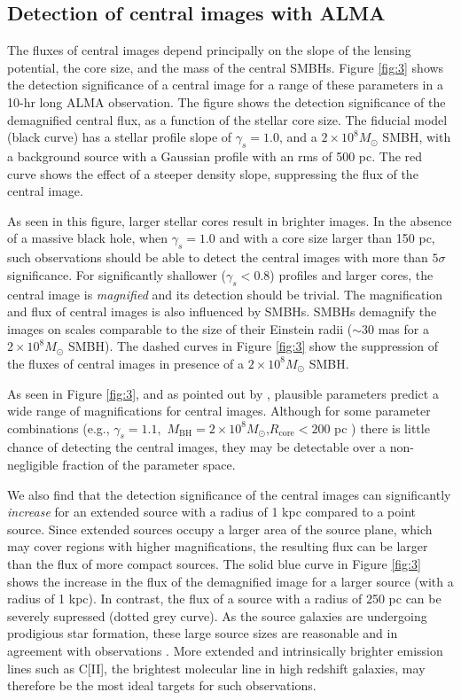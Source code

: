 \documentclass[chicago]{emulateapj}
\begin{document}
\subsection{Detection of central images with ALMA}
The fluxes of central images depend principally on the slope of the lensing potential, the core size, and the mass of the central SMBHs.  Figure \ref{fig:3} shows the detection significance of a central image for a range of these parameters in a 10-hr long ALMA observation. 
The figure shows the detection significance of the demagnified central flux, as a function of the stellar core size.
The fiducial model (black curve) has a stellar profile slope of $\gamma_s=1.0$, and a $2\times10^8M_{\odot}$ SMBH, with a background source 
with a Gaussian profile with an rms of 500 pc.  The red curve shows the effect of a steeper density slope, suppressing the flux of the central image. 




As seen in this figure, larger stellar cores result in brighter images. 
In the absence of a massive black hole, when $\gamma_s=1.0$ and with a core size larger than 150 pc, such observations should be able to detect the central images with more than $5\sigma$ significance. For significantly shallower ($\gamma_s<0.8$) profiles and larger cores, the central image is \emph{magnified} and its detection should be trivial.  The magnification and flux of central images is also influenced by SMBHs.
SMBHs demagnify the images on scales comparable to the size of their Einstein radii ($\sim30$ mas for a $2\times10^8M_{\odot}$ SMBH).
The dashed curves in Figure \ref{fig:3} show the suppression of the fluxes of central images in presence of a $2\times10^8M_{\odot}$ SMBH.

As seen in Figure \ref{fig:3}, and as pointed out by \citet{Keeton:03}, plausible parameters predict  a wide range of magnifications for   central images. Although for some parameter combinations (e.g., $\gamma_{s}=1.1,$ $M_{\mathrm{BH}} = 2\times10^8 M_{\odot}$,$R_{\mathrm{core}}<200$ pc ) there is little chance of detecting the central images, they may be detectable over a non-negligible fraction of the parameter space.

We also find that the detection significance of the central images can significantly \emph{increase} for an extended source with a radius of 1 kpc compared to a point source. Since extended sources occupy a larger area of the source plane, which may cover regions with higher magnifications, the resulting flux can be larger than the flux of more compact sources. The solid blue curve in Figure \ref{fig:3} shows the increase in the flux of the demagnified image for a larger source (with a radius of 1 kpc). In contrast, the flux of a source with a radius of 250 pc can be severely supressed (dotted grey curve). 
As the source galaxies are undergoing prodigious star formation, these large source sizes are reasonable and in agreement with observations \citep{hezaveh:13b}.
More extended and intrinsically brighter emission lines such as C[II], the brightest molecular line in high redshift galaxies, may therefore be the most ideal targets for such observations.
\end{document}
